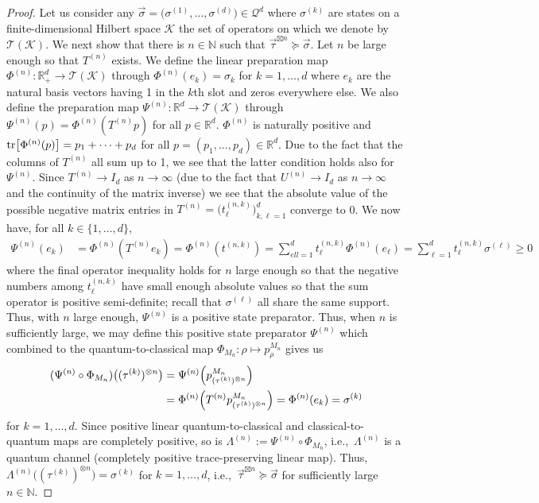 \documentclass[12pt,a4paper,reqno]{amsart}
\theoremstyle{definition}
\newcommand{\mc}[1]{\mathcal{#1}}
\newcommand{\N}{\mathbb N}
\newcommand{\R}{\mathbb R}
\newcommand{\tr}[1]{\mathrm{tr}\left[#1\right]} %
\let\originalleft\left
\let\originalright\right
\renewcommand{\left}{\mathopen{}\mathclose\bgroup\originalleft}
\renewcommand{\right}{\aftergroup\egroup\originalright}
\begin{document}
\begin{proof}
Let us consider any $\vec{\sigma}=\big(\sigma^{(1)},\ldots,\sigma^{(d)}\big)\in\mc Q^d$ where $\sigma^{(k)}$ are states on a finite-dimensional Hilbert space $\mc K$ the set of operators on which we denote by $\mc T(\mc K)$. We next show that there is $n\in\N$ such that $\vec{\tau}^{\boxtimes n}\succeq\vec{\sigma}$. Let $n$ be large enough so that $T^{(n)}$ exists. We define the linear preparation map $\Phi^{(n)}:\R_+^d\to\mc T(\mc K)$ through $\Phi^{(n)}(e_k)=\sigma_k$ for $k=1,\ldots,d$ where $e_k$ are the natural basis vectors having 1 in the $k$th slot and zeros everywhere else. We also define the preparation map $\Psi^{(n)}:\R^d\to\mc T(\mc K)$ through $\Psi^{(n)}(p)=\Phi^{(n)}(T^{(n)}p)$ for all $p\in\R^d$. $\Phi^{(n)}$ is naturally positive and $\tr{\Phi^{(n)}(p)}=p_1+\cdots+p_d$ for all $p=(p_1,\ldots,p_d)\in\R^d$. Due to the fact that the columns of $T^{(n)}$ all sum up to 1, we see that the latter condition holds also for $\Psi^{(n)}$. Since $T^{(n)}\to I_d$ as $n\to\infty$ (due to the fact that $U^{(n)}\to I_d$ as $n\to\infty$ and the continuity of the matrix inverse) we see that the absolute value of the possible negative matrix entries in $T^{(n)}=\big(t^{(n,k)}_\ell\big)_{k,\ell=1}^d$ converge to 0. We now have, for all $k\in\{1,\ldots,d\}$,
\begin{align*}
\Psi^{(n)}(e_k)&=\Phi^{(n)}(T^{(n)}e_k)=\Phi^{(n)}(t^{(n,k)})=\sum_{ell=1}^d t^{(n,k)}_\ell\Phi^{(n)}(e_\ell)=\sum_{\ell=1}^d t^{(n,k)}_\ell\sigma^{(\ell)}\geq0
\end{align*}
where the final operator inequality holds for $n$ large enough so that the negative numbers among $t^{(n,k)}_\ell$ have small enough absolute values so that the sum operator is positive semi-definite; recall that $\sigma^{(\ell)}$ all share the same support. Thus, with $n$ large enough, $\Psi^{(n)}$ is a positive state preparator. Thus, when $n$ is sufficiently large, we may define this positive state preparator $\Psi^{(n)}$ which combined to the quantum-to-classical map $\Phi_{M_n}:\rho\mapsto p^{M_n}_{\rho}$ gives us
\begin{align*}
(\Psi^{(n)}\circ\Phi_{M_n})\big((\tau^{(k)})^{\otimes n}\big)&=\Psi^{(n)}\left(p^{M_n}_{(\tau^{(k)})^{\otimes n}}\right)\\
&=\Phi^{(n)}\left(T^{(n)}p^{M_n}_{(\tau^{(k)})^{\otimes n}}\right)=\Phi^{(n)}(e_k)=\sigma^{(k)}
\end{align*}
for $k=1,\ldots,d$. Since positive linear quantum-to-classical and classical-to-quantum maps are completely positive, so is $\Lambda^{(n)}:=\Psi^{(n)}\circ\Phi_{M_n}$, i.e.,\ $\Lambda^{(n)}$ is a quantum channel (completely positive trace-preserving linear map). Thus, $\Lambda^{(n)}\big((\tau^{(k)})^{\otimes n}\big)=\sigma^{(k)}$ for $k=1,\ldots,d$, i.e.,\ $\vec{\tau}^{\boxtimes n}\succeq\vec{\sigma}$ for sufficiently large $n\in\N$.


\end{proof}
\end{document}
